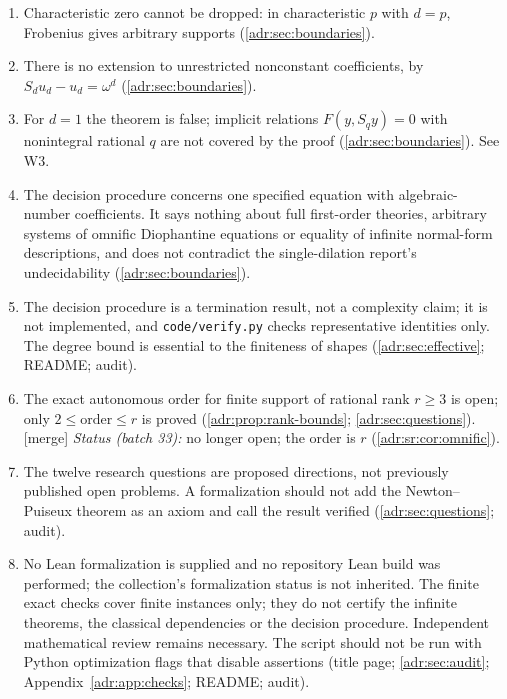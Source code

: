 \documentclass[11pt,letterpaper]{article}
\numberwithin{equation}{section}
\theoremstyle{definition}
\theoremstyle{remark}
\newcommand{\rpath}[1]{\nolinkurl{#1}}%
\newcommand{\mtag}{\textup{[merge]}}%
\begin{document}
\begin{enumerate}[label=S\arabic*.,leftmargin=2.6em,itemsep=2pt]
\cref{adr:sec:audit}; audit).
\item Characteristic zero cannot be dropped: in characteristic $p$ with
$d=p$, Frobenius gives arbitrary supports (\cref{adr:sec:boundaries}).
\item There is no extension to unrestricted nonconstant coefficients, by
$S_du_d-u_d=\omega^d$ (\cref{adr:sec:boundaries}).
\item For $d=1$ the theorem is false; implicit relations $F(y,S_qy)=0$
with nonintegral rational $q$ are not covered by the proof
(\cref{adr:sec:boundaries}). See W3.
\item The decision procedure concerns one specified equation with
algebraic-number coefficients. It says nothing about full first-order
theories, arbitrary systems of omnific Diophantine equations or equality of
infinite normal-form descriptions, and does not contradict the
single-dilation report's undecidability (\cref{adr:sec:boundaries}).
\item The decision procedure is a termination result, not a complexity
claim; it is not implemented, and \rpath{code/verify.py} checks
representative identities only. The degree bound is essential to the
finiteness of shapes (\cref{adr:sec:effective}; README; audit).
\item The exact autonomous order for finite support of rational rank
$r\ge3$ is open; only $2\le\text{order}\le r$ is proved
(\cref{adr:prop:rank-bounds}; \cref{adr:sec:questions}).
\mtag{} \emph{Status (batch 33):} no longer open; the order is $r$
(\cref{adr:sr:cor:omnific}).
\item The twelve research questions are proposed directions, not
previously published open problems. A formalization should not add the
Newton--Puiseux theorem as an axiom and call the result verified
(\cref{adr:sec:questions}; audit).
\item No Lean formalization is supplied and no repository Lean build was
performed; the collection's formalization status is not inherited. The
finite exact checks cover finite instances only; they do not certify the
infinite theorems, the classical dependencies or the decision procedure.
Independent mathematical review remains necessary. The script should not
be run with Python optimization flags that disable assertions (title page;
\cref{adr:sec:audit}; Appendix~\ref{adr:app:checks}; README; audit).
\end{enumerate}
\end{document}
